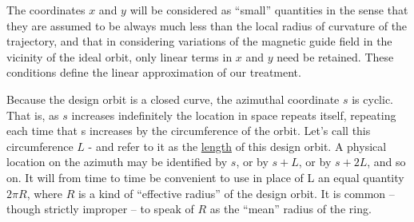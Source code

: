 The coordinates $x$ and $y$ will be considered as “small” quantities in the sense that they are assumed to be always much less than the local radius of curvature of the trajectory, and that in considering variations of the magnetic guide field in the vicinity of the ideal orbit, only linear terms in $x$ and $y$ need be retained. These conditions define the linear approximation of our treatment.

Because the design orbit is a closed curve, the azimuthal coordinate $s$ is cyclic. That is, as $s$ increases indefinitely the location in space repeats itself, repeating each time that s increases by the circumference of the orbit. Let’s call this circumference $L$ - and refer to it as the \underline{length} of this design orbit. A physical location on the azimuth may be identified by $s$, or by $s + L$, or by $s + 2L$, and so on. It will from time to time be convenient to use in place of L an equal quantity $2\pi R$, where $R$ is a kind of “effective radius” of the design orbit. It is common -- though strictly improper -- to speak of $R$ as the “mean” radius of the ring.

